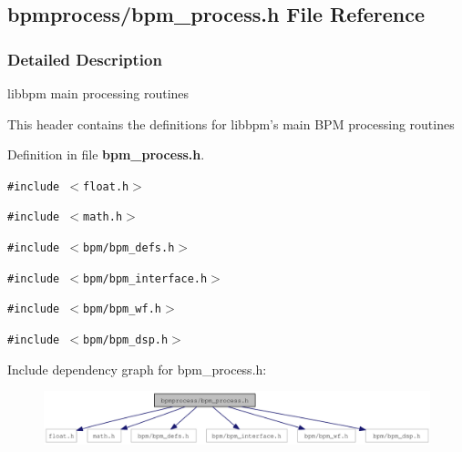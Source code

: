 \subsection{bpmprocess/bpm\_\-process.h File Reference}
\label{bpm__process_8h}


\subsubsection{Detailed Description}
libbpm main processing routines 

This header contains the definitions for libbpm's main BPM processing routines 

Definition in file {\bf bpm\_\-process.h}.

{\tt \#include $<$float.h$>$}\par
{\tt \#include $<$math.h$>$}\par
{\tt \#include $<$bpm/bpm\_\-defs.h$>$}\par
{\tt \#include $<$bpm/bpm\_\-interface.h$>$}\par
{\tt \#include $<$bpm/bpm\_\-wf.h$>$}\par
{\tt \#include $<$bpm/bpm\_\-dsp.h$>$}\par


Include dependency graph for bpm\_\-process.h:\nopagebreak
\begin{figure}[H]
\begin{center}
\leavevmode
\includegraphics[width=336pt]{bpm__process_8h__incl}
\end{center}
\end{figure}
